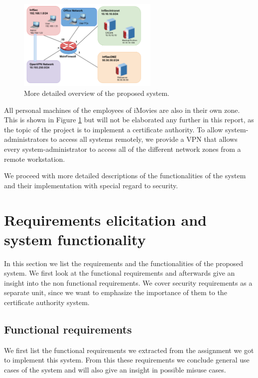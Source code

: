 \documentclass[a4paper, toc=index, 12pt, DIV14, twoside, BCOR2cm, headsepline, numbers=noenddot, bibliography=totoc]{report}
\begin{document}
\begin{figure}[H]
  \centering
    \includegraphics[width=0.6\textwidth]{images/system_overview_new.pdf}  
  \caption{More detailed overview of the proposed system.}
  \label{systemoverview}
\end{figure}

All personal machines of the employees of iMovies are also in their own zone. This is shown in Figure \ref{systemoverview} but will not be elaborated any further in this report, as the topic of the project is to implement a certificate authority.\newline
To allow system-administrators to access all systems remotely, we provide a VPN that allows every system-administrator to access all of the different network zones from a remote workstation.

We proceed with more detailed descriptions of the functionalities of the system and their implementation with special regard to security.

\section{Requirements elicitation and system functionality}
In this section we list the requirements and the functionalities of the proposed system. We first look at the functional requirements and afterwards give an insight into the non functional requirements. We cover security requirements as a separate unit, since we want to emphasize the importance of them to the certificate authority system.

\subsection{Functional requirements}
We first list the functional requirements we extracted from the assignment we got to implement this system. From this these requirements we conclude general use cases of the system and will also give an insight in possible misuse cases.
\end{document}

